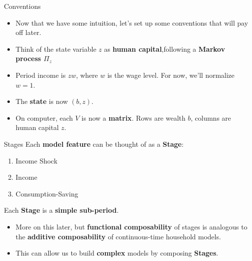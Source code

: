 \documentclass[10pt,aspectratio=169]{beamer}
\begin{document}
\begin{frame}{Conventions}
  \begin{itemize}
    \item Now that we have some intuition, let's set up some conventions that will pay off later.
    \item Think of the state variable $z$ as \textbf{human capital},following a \textbf{Markov process $\Pi_z$}
    \item Period income is $zw$, where $w$ is the wage level. For now, we'll normalize $w = 1$.
    \item The \textbf{state} is now $(b, z)$.
    \item On computer, each $V$ is now a \textbf{matrix}. Rows are wealth $b$, columns are human capital $z$.
  \end{itemize}
\end{frame}

\begin{frame}{Stages}  
  Each \textbf{model feature} can be thought of as a \textbf{Stage}:
  \begin{enumerate}
    \item Income Shock
    \item Income
    \item Consumption-Saving
  \end{enumerate}
  Each \textbf{Stage} is a \textbf{simple sub-period}.
  \begin{itemize}
    \item More on this later, but \textbf{functional composability} of stages is analogous to the \textbf{additive composability} of continuous-time household models.
    \item This can allow us to build \textbf{complex} models by composing \textbf{Stages}.
  \end{itemize}
\end{frame}
\end{document}
